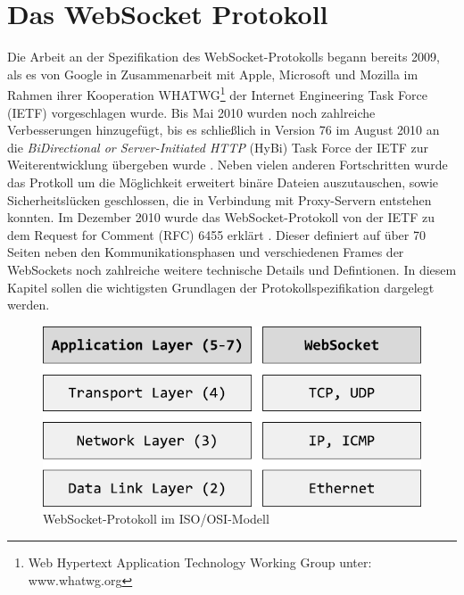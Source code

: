 \documentclass[11pt,a4paper,titlepage]{scrartcl}
\numberwithin{equation}{section}
\begin{document}
\section{Das WebSocket Protokoll}\label{sec:WebSocketProtokoll}
Die Arbeit an der Spezifikation des WebSocket-Protokolls begann bereits 2009, als es von Google in Zusammenarbeit mit Apple, Microsoft und Mozilla im Rahmen ihrer Kooperation WHATWG\footnote{Web Hypertext Application Technology Working Group unter: www.whatwg.org} der Internet Engineering Task Force (IETF) vorgeschlagen wurde. Bis Mai 2010 wurden noch zahlreiche Verbesserungen hinzugefügt, bis es schließlich in Version 76 \autocite{hickson_websocket_2010} im August 2010 an die \textit{BiDirectional or Server-Initiated HTTP} (HyBi) Task Force der IETF zur Weiterentwicklung übergeben wurde \autocite{fette_websocket_2010}. Neben vielen anderen Fortschritten wurde das Protkoll um die Möglichkeit erweitert binäre Dateien auszutauschen, sowie Sicherheitslücken geschlossen, die in Verbindung mit Proxy-Servern entstehen konnten. Im Dezember 2010 wurde das WebSocket-Protokoll von der IETF zu dem Request for Comment (RFC) 6455 erklärt \autocite{fette_websocket_2011}. Dieser definiert auf über 70 Seiten neben den Kommunikationsphasen und verschiedenen Frames der WebSockets noch zahlreiche weitere technische Details und Defintionen. In diesem Kapitel sollen die wichtigsten Grundlagen der Protokollspezifikation dargelegt werden.\\
\begin{figure}[ht] \label{fig:wsOSI}
\begin{center}
	\includegraphics[scale=1]{img/osi.pdf}
	\caption{WebSocket-Protokoll im ISO/OSI-Modell}
\end{center}
\end{figure}
\end{document}
